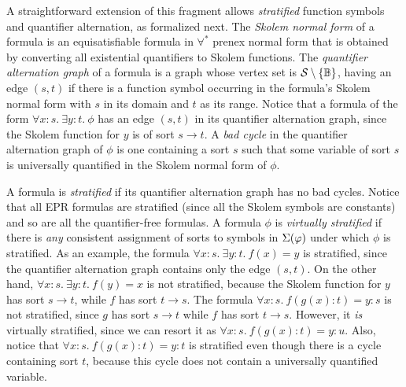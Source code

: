 A straightforward extension of this fragment allows \emph{stratified} function symbols and quantifier alternation, as formalized next.
The \emph{Skolem normal form} of a formula is an equisatisfiable formula in $\forall^{*}$ prenex normal form that is obtained by converting all existential quantifiers to Skolem functions.
The \emph{quantifier alternation graph} of a formula is a graph whose vertex set is $\mathcal{S}\setminus\{\mathbb{B}\}$, having an edge $(s,t)$ if there is a function symbol occurring in the formula's Skolem normal form with $s$ in its
domain and $t$ as its range. Notice that a formula of the form $\forall x:s.\ \exists y:t.\ \phi$ has an edge $(s,t)$ in its quantifier alternation graph, since the Skolem function for $y$ is of sort $s\rightarrow t$.
A \emph{bad cycle} in the quantifier alternation graph of $\phi$ is one containing a sort $s$ such that some variable of sort $s$ is universally quantified in the Skolem normal form of $\phi$.

%
A formula is \emph{stratified} if its quantifier alternation graph has no bad
cycles.
Notice that all EPR formulas are stratified (since all the Skolem symbols are constants) and so are all the quantifier-free formulas.
A formula $\phi$ is \emph{virtually stratified} if there is \emph{any} consistent assignment of sorts to symbols in ${\Sigma}(\varphi)$ under which $\phi$ is stratified.
%
As an example, the formula $\forall x:s.\ \exists y:t.\ f(x) = y$ is stratified, since the quantifier alternation graph contains only the edge $(s,t)$. On the other hand,
$\forall x:s.\ \exists y:t.\ f(y) = x$ is not stratified, because the Skolem function for $y$ has sort $s\rightarrow t$, while $f$ has sort $t\rightarrow s$.
The formula $\forall x:s.\ f(g(x):t) = y:s$ is not stratified, since $g$ has sort $s\rightarrow t$ while $f$ has sort $t \rightarrow s$. However, it \emph{is} virtually stratified,
since we can resort it as $\forall x:s.\ f(g(x):t) = y:u$. Also, notice that $\forall x:s.\ f(g(x):t) = y:t$ is stratified even though there is a cycle containing sort $t$, because
this cycle does not contain a universally quantified variable.

